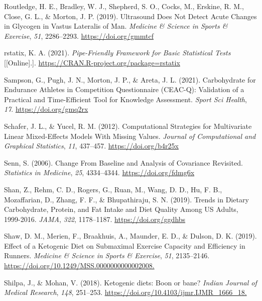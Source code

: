 \documentclass[]{cik}%
\newlength{\cslhangindent}
\newlength{\cslentryspacingunit} %
\newenvironment{CSLReferences}[2] %
 {%
  \setlength{\parindent}{0pt}
  \ifodd #1
  \let\oldpar\par
  \def\par{\hangindent=\cslhangindent\oldpar}
  \fi
  \setlength{\parskip}{#2\cslentryspacingunit}
 }%
 {}
\begin{document}
\begin{CSLReferences}{1}{0}
\leavevmode{}%
Routledge, H. E., Bradley, W. J., Shepherd, S. O., Cocks, M., Erskine,
R. M., Close, G. L., \& Morton, J. P. (2019). Ultrasound Does Not Detect
Acute Changes in Glycogen in Vastus Lateralis of Man. \emph{Medicine \&
Science in Sports \& Exercise}, \emph{51}, 2286--2293.
\url{https://doi.org/gmmtcf}

\leavevmode{}%
rstatix, K. A. (2021). \emph{Pipe-Friendly Framework for Basic
Statistical Tests} {[}{[}Online{]}.{]}.
\url{https://CRAN.R-project.org/package=rstatix}

\leavevmode{}%
Sampson, G., Pugh, J. N., Morton, J. P., \& Areta, J. L. (2021).
Carbohydrate for Endurance Athletes in Competition Questionnaire
(CEAC-Q): Validation of a Practical and Time-Efficient Tool for
Knowledge Assessment. \emph{Sport Sci Health}, \emph{17}.
\url{https://doi.org/gmq2rx}

\leavevmode{}%
Schafer, J. L., \& Yucel, R. M. (2012). Computational Strategies for
Multivariate Linear Mixed-Effects Models With Missing Values.
\emph{Journal of Computational and Graphical Statistics}, \emph{11},
437--457. \url{https://doi.org/b4r25x}

\leavevmode{}%
Senn, S. (2006). Change From Baseline and Analysis of Covariance
Revisited. \emph{Statistics in Medicine}, \emph{25}, 4334--4344.
\url{https://doi.org/fdmg6x}

\leavevmode{}%
Shan, Z., Rehm, C. D., Rogers, G., Ruan, M., Wang, D. D., Hu, F. B.,
Mozaffarian, D., Zhang, F. F., \& Bhupathiraju, S. N. (2019). Trends in
Dietary Carbohydrate, Protein, and Fat Intake and Diet Quality Among US
Adults, 1999-2016. \emph{JAMA}, \emph{322}, 1178--1187.
\url{https://doi.org/ggdhbs}

\leavevmode{}%
Shaw, D. M., Merien, F., Braakhuis, A., Maunder, E. D., \& Dulson, D. K.
(2019). Effect of a Ketogenic Diet on Submaximal Exercise Capacity and
Efficiency in Runners. \emph{Medicine \& Science in Sports \& Exercise},
\emph{51}, 2135--2146.
\url{https://doi.org/10.1249/MSS.0000000000002008.}

\leavevmode{}%
Shilpa, J., \& Mohan, V. (2018). Ketogenic diets: Boon or bane?
\emph{Indian Journal of Medical Research}, \emph{148}, 251--253.
\url{https://doi.org/10.4103/ijmr.IJMR_1666_18.}


\end{CSLReferences}
\end{document}
